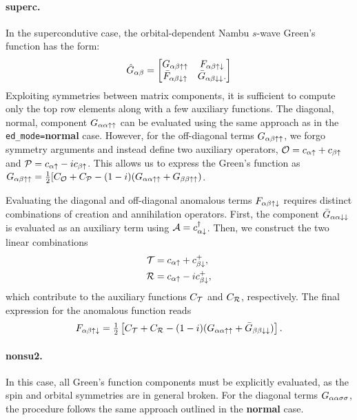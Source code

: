 \documentclass[edipack_sp.tex]{subfiles}
\begin{document}
\paragraph{{\bf superc}.}
In the supercondutive case, the orbital-dependent Nambu $s$-wave
Green's function has the form:
\begin{equation}
  \label{GFnambu}
  \hat{G}_{\alpha\beta} =
  \begin{bmatrix}
    G_{\alpha\beta\uparrow\uparrow} & F_{\alpha\beta\uparrow\downarrow} \\
    \bar{F}_{\alpha\beta\downarrow\uparrow} & \bar{G}_{\alpha\beta\downarrow\downarrow}.
  \end{bmatrix}  
\end{equation}
Exploiting symmetries between matrix components, it is 
sufficient to compute only the top row elements along with 
a few auxiliary functions\cite{Capone2001PRL,Capone2002Science,Capone2004sc,Toschi2005NJP,Toschi2005PRB,Capone2009RMP}.
%
The diagonal, normal, component $G_{\alpha\alpha\uparrow\uparrow}$ can be 
evaluated using the same approach as in the {\tt ed\_mode=}{\bf normal} 
case. However, for the off-diagonal terms $G_{\alpha\beta\uparrow\uparrow}$, 
we forgo symmetry arguments and instead define two 
auxiliary operators, ${\cal O} = c_{\alpha\uparrow} + c_{\beta\uparrow}$ and 
${\cal P} = c_{\alpha\uparrow} - i c_{\beta\uparrow}$. This allows us to express 
the Green's function as
$G_{\alpha\beta\uparrow\uparrow}=\tfrac{1}{2}[C_{\cal O} + C_{\cal P} -
(1-i)(G_{\alpha\alpha\uparrow\uparrow}+G_{\beta\beta\uparrow\uparrow})$.

Evaluating the diagonal and off-diagonal anomalous terms 
$F_{\alpha\beta\uparrow\downarrow}$ requires distinct combinations of 
creation and annihilation operators\cite{Capone2001PRL,Capone2002Science,Capone2004sc,Toschi2005NJP,Toschi2005PRB}. First, the component 
$\bar{G}_{\alpha\alpha\downarrow\downarrow}$ is evaluated as an auxiliary term 
using ${\cal A} = c^\dagger_{\alpha\downarrow}$. Then, we construct the two  
linear combinations
\begin{align*}
{\cal T} &= c_{\alpha\uparrow} + c^+_{\beta\downarrow}, \\
{\cal R} &= c_{\alpha\uparrow} - i c^+_{\beta\downarrow},
\end{align*}
which contribute to the auxiliary functions $C_{\cal T}$ and 
$C_{\cal R}$, respectively. The final expression for the 
anomalous function reads
\begin{equation}
F_{\alpha\beta\uparrow\downarrow} = \tfrac{1}{2} \left[ C_{\cal T} + C_{\cal R} - 
(1-i)(G_{\alpha\alpha\uparrow\uparrow} + \bar{G}_{\beta\beta\downarrow\downarrow}) \right].
\end{equation}



\paragraph{{\bf nonsu2}.}
In this case, all Green's function components 
must be explicitly evaluated, as the spin and orbital 
symmetries are in general broken. For the diagonal terms 
$G_{\alpha\alpha\sigma\sigma}$, the procedure follows the same approach 
outlined in the {\bf normal} case. 
\end{document}
